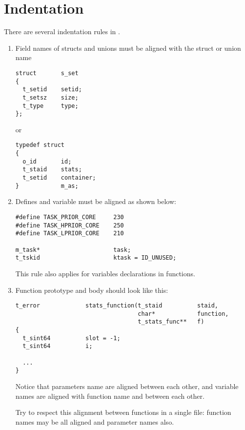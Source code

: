 \section*{Indentation}

There are several indentation rules in \kaneton.

\begin{enumerate}

\item  Field names  of structs  and unions  must be  aligned  with the
struct or union name

\begin{verbatim}
struct       s_set
{
  t_setid    setid;
  t_setsz    size;
  t_type     type;
};
\end{verbatim}

or

\begin{verbatim}
typedef struct
{
  o_id       id;
  t_staid    stats;
  t_setid    container;
}            m_as;
\end{verbatim}

\item Defines and variable must be aligned as shown below:

\begin{verbatim}
#define TASK_PRIOR_CORE     230
#define TASK_HPRIOR_CORE    250
#define TASK_LPRIOR_CORE    210

m_task*                     task;
t_tskid                     ktask = ID_UNUSED;
\end{verbatim}

This rule also applies for variables declarations in functions.

\item Function prototype and body should look like this:

\begin{verbatim}
t_error             stats_function(t_staid          staid,
                                   char*            function,
                                   t_stats_func**   f)
{
  t_sint64          slot = -1;
  t_sint64          i;

  ...
}
\end{verbatim}

Notice  that  parameters name  are  aligned  between  each other,  and
variable names are aligned with function name and between each other.

Try  to respect  this alignment  between functions  in a  single file:
function names may be all aligned and parameter names also.

\end{enumerate}

